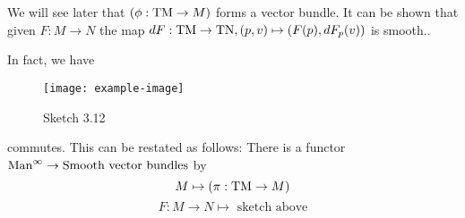 \begin{remark}
    We will see later %
    that \((\phi:{\text{TM}}\to M)\) forms a vector bundle. It can be shown that 
    given \(F:M\to N\) the map \(dF:{\text{TM}}\to\text{TN}, (p,v)\mapsto (F(p),dF_p(v))\) is smooth..

    In fact, we have 
    \begin{figure}[H]
        \centering
        \texttt{[image: example-image]}
        \caption{Sketch 3.12}
    \end{figure}
    commutes. This can be restated as follows: There is a functor \(\text{Man}^\infty\to\text{Smooth vector bundles}\)
    by \[M\mapsto (\pi:{\text{TM}}\to M)\]
    \[F:M\to N\mapsto \text{ sketch above}\]
\end{remark}




